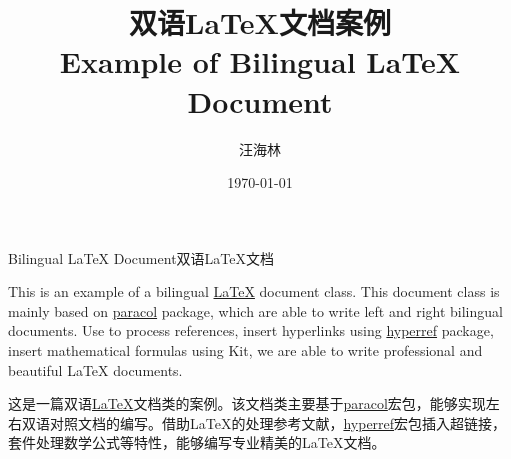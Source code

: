\documentclass{bilidoc}
\title{\textbf{双语\LaTeX{}文档案例\\Example of Bilingual \LaTeX{} Document}}
\author{汪海林}
\date{\today}
\begin{document}
\maketitle

\vspace{20mm}

\tableofcontents

\newpage

\begin{Abstract}{Bilingual \LaTeX{} Document}{双语\LaTeX{}文档}

    This is an example of a bilingual \href{https://www.latex-project.org/}{\LaTeX{}} document class. This document class is mainly based on \href{https://www.ctan.org/pkg/paracol}{paracol} package, which are able to write left and right bilingual documents. Use \href{http://www.bibtex.org/}{\BibTeX{}} to process references, insert hyperlinks using \href{https://www.ctan.org/pkg/hyperref}{hyperref} package, insert mathematical formulas using \href{https://www.ctan.org/pkg/amstex}{\AMSTeX} Kit, we are able to write professional and beautiful \LaTeX{} documents.

    \switchcolumn

    这是一篇双语\href{https://www.latex-project.org/}{\LaTeX{}}文档类的案例。该文档类主要基于\href{https://www.ctan.org/pkg/paracol}{paracol}宏包，能够实现左右双语对照文档的编写。借助\LaTeX{}的\href{http://www.bibtex.org/}{\BibTeX{}}处理参考文献，\href{https://www.ctan.org/pkg/hyperref}{hyperref}宏包插入超链接，\href{https://www.ctan.org/pkg/amstex}{\AMSTeX}套件处理数学公式等特性，能够编写专业精美的\LaTeX{}文档。


\end{Abstract}




\end{document}
